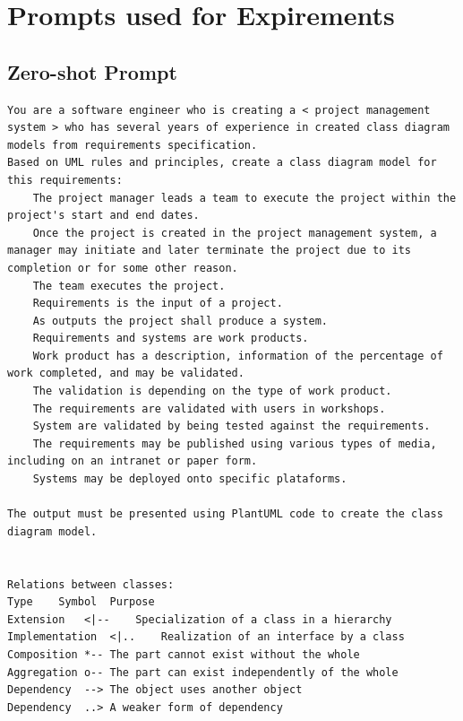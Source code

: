 
%

\chapter{Prompts used for Expirements}
\label{app:prompt_testing}

\section{Zero-shot Prompt}
\begin{lstlisting}[caption={Zero-shot prompt}, label={lst:zero_shot},basicstyle=\ttfamily\tiny]
You are a software engineer who is creating a < project management system > who has several years of experience in created class diagram models from requirements specification.
Based on UML rules and principles, create a class diagram model for this requirements: 
    The project manager leads a team to execute the project within the project's start and end dates.
    Once the project is created in the project management system, a manager may initiate and later terminate the project due to its completion or for some other reason.
    The team executes the project.
    Requirements is the input of a project.
    As outputs the project shall produce a system.
    Requirements and systems are work products.
    Work product has a description, information of the percentage of work completed, and may be validated.
    The validation is depending on the type of work product.
    The requirements are validated with users in workshops.
    System are validated by being tested against the requirements.
    The requirements may be published using various types of media, including on an intranet or paper form.
    Systems may be deployed onto specific plataforms. 

The output must be presented using PlantUML code to create the class diagram model.


Relations between classes:
Type	Symbol	Purpose
Extension	<|--	Specialization of a class in a hierarchy
Implementation	<|..	Realization of an interface by a class
Composition	*--	The part cannot exist without the whole
Aggregation	o--	The part can exist independently of the whole
Dependency	-->	The object uses another object
Dependency	..>	A weaker form of dependency


\end{lstlisting}
